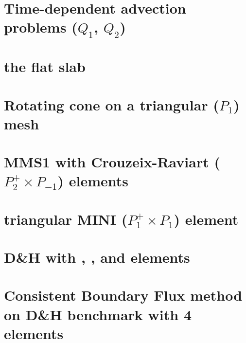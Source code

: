 \documentclass[a4paper,11pt]{report}
\begin{document}
\chapter{Time-dependent advection problems ($Q_1$, $Q_2$)\label{f43}} %

\chapter{the flat slab \label{f44}} %

\chapter{Rotating cone on a triangular ($P_1$) mesh\label{f45}} %

\chapter{MMS1 with Crouzeix-Raviart ($P_2^+\times P_{-1}$) elements  \label{f46}} %

\chapter{triangular MINI ($P_1^+\times P_1$) element \label{f47}} %

\chapter{D\&H with \QonePzero, \QtwoQone, \QthreeQtwo and \QfourQthree elements \label{f48}} %

\chapter{Consistent Boundary Flux method on D\&H benchmark with 4 elements \label{f49}} %
\end{document}
